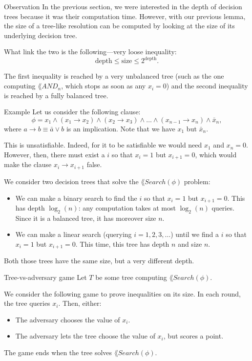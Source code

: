 \documentclass[a4paper]{article}
\begin{document}
\begin{parag}{Observation}
    In the previous section, we were interested in the depth of decision trees because it was their computation time. However, with our previous lemma, the size of a tree-like resolution can be computed by looking at the size of its underlying decision tree.

    What link the two is the following---very loose inequality:
    \[\text{depth} \leq \text{size} \leq 2^{\text{depth}}.\]

    The first inequality is reached by a very unbalanced tree (such as the one computing $\lang{AND}_n$, which stops as soon as any $x_i = 0$) and the second inequality is reached by a fully balanced tree. 
\end{parag}

\begin{parag}{Example}
    Let us consider the following clause: 
    \[\phi = x_1 \land \left(x_1 \to x_2\right) \land \left(x_2 \to x_3\right) \land \ldots \land \left(x_{n-1} \to x_n\right) \land \bar{x}_n,\]
    where $a \to b \equiv \bar{a} \lor b$ is an implication. Note that we have $x_1$ but $\bar{x}_n$. 

    This is unsatisfiable. Indeed, for it to be satisfiable we would need $x_1$ and $x_n = 0$. However, then, there must exist a $  i$ so that $x_i = 1$ but $x_{i+1} = 0$, which would make the clause $x_i \to x_{i+1}$ false.

    We consider two decision trees that solve the $\lang{Search}\left(\phi\right)$ problem:
    \begin{itemize}
        \item We can make a binary search to find the $i$ so that $x_i = 1$ but $x_{i+1} = 0$. This has depth $\log_2\left(n\right)$: any computation takes at most $\log_2\left(n\right)$ queries. Since it is a balanced tree, it has moreover size $n$.
        \item We can make a linear search (querying $i = 1, 2, 3, \ldots$) until we find a $i$ so that $x_i = 1$ but $x_{i+1} = 0$. This time, this tree has depth $n$ and size $n$.
    \end{itemize}

    Both those trees have the same size, but a very different depth.
\end{parag}
 
\begin{parag}{Tree-vs-adversary game}
    Let $T$ be some tree computing $\lang{Search}\left(\phi\right)$.

    We consider the following game to prove inequalities on its size. In each round, the tree queries $x_i$. Then, either:
    \begin{itemize}
        \item The adversary chooses the value of $x_i$.
        \item The adversary lets the tree choose the value of $x_i$, but scores a point.
    \end{itemize}

    The game ends when the tree solves $\lang{Search}\left(\phi\right)$.
\end{parag}
\end{document}
